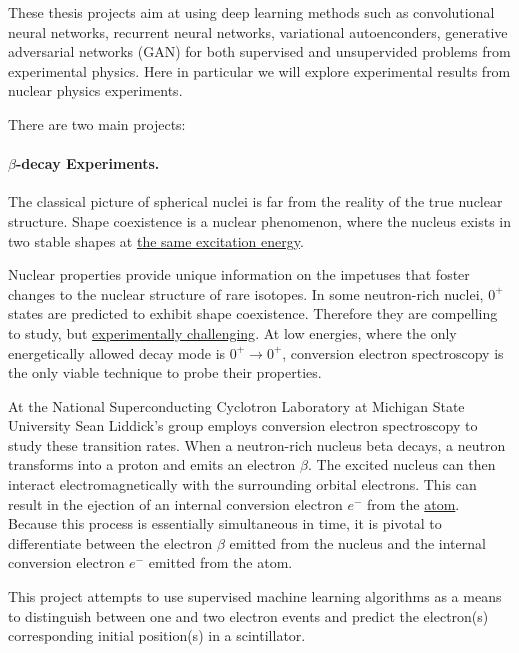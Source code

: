 \documentclass[%
oneside,                 %
final,                   %
10pt]{article}
\begin{document}
These thesis projects aim at using deep learning methods such as
convolutional neural networks, recurrent neural networks, variational
autoenconders, generative adversarial networks (GAN) for both
supervised and unsupervided problems from experimental physics.  Here
in particular we will explore experimental results from nuclear
physics experiments.

There are two main projects:


\paragraph{$\beta$-decay Experiments.}
The classical picture of spherical nuclei is far from the reality of
the true nuclear structure. Shape coexistence is a nuclear phenomenon,
where the nucleus exists in two stable shapes at \href{{https://www.europhysicsnews.org/articles/epn/pdf/2001/01/epn01101.pdf}}{the same excitation
energy}.


Nuclear properties provide unique information on the impetuses that
foster changes to the nuclear structure of rare isotopes. In some
neutron-rich nuclei, $0^{+}$ states are predicted to exhibit shape
coexistence. Therefore they are compelling to study, but \href{{http://iopscience.iop.org/article/10.1088/0954-3899/43/2/024001}}{experimentally
challenging}.
At low energies, where the only energetically allowed decay mode is
$0^{+} \rightarrow 0^{+}$, conversion electron spectroscopy is the
only viable technique to probe their properties.



At the National Superconducting Cyclotron Laboratory at Michigan State
University Sean Liddick's group employs conversion electron
spectroscopy to study these transition rates. When a neutron-rich
nucleus beta decays, a neutron transforms into a proton and emits an
electron $\beta$. The excited nucleus can then interact
electromagnetically with the surrounding orbital electrons. This can
result in the ejection of an internal conversion electron $e^{-}$ from
the
\href{{https://www.sciencedirect.com/science/article/pii/S0065253908608884}}{atom}.
Because this process is essentially simultaneous in time, it is
pivotal to differentiate between the electron $\beta$ emitted from the
nucleus and the internal conversion electron $e^{-}$ emitted from the
atom.

This project attempts to use supervised machine learning algorithms as a
means to distinguish between one and two electron events and predict the
electron(s) corresponding initial position(s) in a scintillator.
\end{document}
